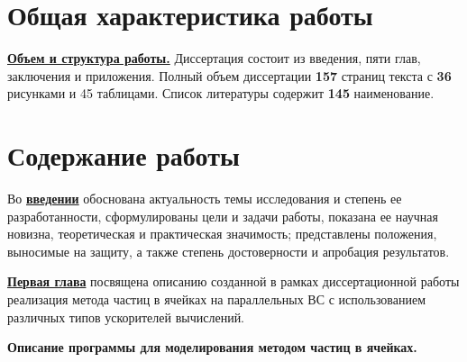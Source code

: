 
\section*{Общая характеристика работы}

\newcommand{\actuality}{\underline{\textbf{\actualityTXT}}}
\newcommand{\progress}{\underline{\textbf{\progressTXT}}}
\newcommand{\aim}{\underline{{\textbf\aimTXT}}}
\newcommand{\tasks}{\underline{\textbf{\tasksTXT}}}
\newcommand{\novelty}{\underline{\textbf{\noveltyTXT}}}
\newcommand{\influence}{\underline{\textbf{\influenceTXT}}}
\newcommand{\methods}{\underline{\textbf{\methodsTXT}}}
\newcommand{\defpositions}{\underline{\textbf{\defpositionsTXT}}}
\newcommand{\reliability}{\underline{\textbf{\reliabilityTXT}}}
\newcommand{\probation}{\underline{\textbf{\probationTXT}}}
\newcommand{\contribution}{\underline{\textbf{\contributionTXT}}}
\newcommand{\publications}{\underline{\textbf{\publicationsTXT}}}



\underline{\textbf{Объем и структура работы.}} Диссертация состоит из введения,
пяти глав, заключения и приложения. Полный объем диссертации
\textbf{157} страниц текста с \textbf{36} рисунками и 45 таблицами. Список литературы содержит \textbf{145} наименование.

\section*{Содержание работы}
Во \underline{\textbf{введении}} 
обоснована актуальность темы исследования и степень
ее разработанности, сформулированы цели и задачи работы, показана ее научная новизна, теоретическая и практическая значимость; представлены положения, выносимые на защиту, а также степень достоверности и апробация результатов.






\underline{\textbf{Первая глава}} посвящена описанию созданной в рамках диссертационной работы реализация метода частиц в ячейках на параллельных ВС с использованием различных типов ускорителей вычислений. 

\textbf{Описание программы для моделирования методом частиц в ячейках.}

